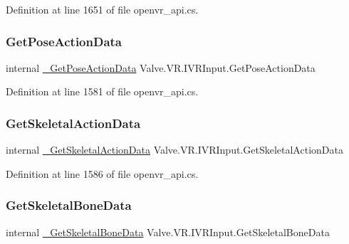 Definition at line 1651 of file openvr\+\_\+api.\+cs.

\mbox{\label{struct_valve_1_1_v_r_1_1_i_v_r_input_af8e2e899374e4363ebfb682372073ac2}} 
\subsubsection{\texorpdfstring{GetPoseActionData}{GetPoseActionData}}
{\footnotesize\ttfamily internal \mbox{\hyperlink{struct_valve_1_1_v_r_1_1_i_v_r_input_aeb5a782b37d5126d81e5a1a21fa69500}{\+\_\+\+Get\+Pose\+Action\+Data}} Valve.\+V\+R.\+I\+V\+R\+Input.\+Get\+Pose\+Action\+Data}



Definition at line 1581 of file openvr\+\_\+api.\+cs.

\mbox{\label{struct_valve_1_1_v_r_1_1_i_v_r_input_aca7416db314f3341f5ad411a04a431df}} 
\subsubsection{\texorpdfstring{GetSkeletalActionData}{GetSkeletalActionData}}
{\footnotesize\ttfamily internal \mbox{\hyperlink{struct_valve_1_1_v_r_1_1_i_v_r_input_ab2dfec875e32f9da69b95675a94957a7}{\+\_\+\+Get\+Skeletal\+Action\+Data}} Valve.\+V\+R.\+I\+V\+R\+Input.\+Get\+Skeletal\+Action\+Data}



Definition at line 1586 of file openvr\+\_\+api.\+cs.

\mbox{\label{struct_valve_1_1_v_r_1_1_i_v_r_input_a8dcd583eddbee8508f65e9a10df4b297}} 
\subsubsection{\texorpdfstring{GetSkeletalBoneData}{GetSkeletalBoneData}}
{\footnotesize\ttfamily internal \mbox{\hyperlink{struct_valve_1_1_v_r_1_1_i_v_r_input_a51bb3d46fb9a17ce1918475f0e1f0f3f}{\+\_\+\+Get\+Skeletal\+Bone\+Data}} Valve.\+V\+R.\+I\+V\+R\+Input.\+Get\+Skeletal\+Bone\+Data}



